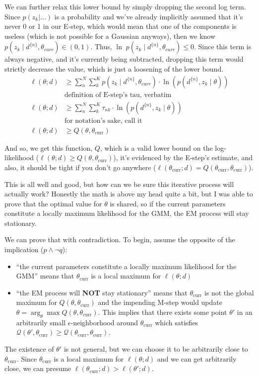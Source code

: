 We can further relax this lower bound by simply dropping the second log term. Since $p(z_k|...)$ is a probability and we've already implicitly assumed that it's never 0 or 1 in our E-step, which would mean that one of the components is useless (which is not possible for a Gaussian anyways), then we know $p(z_k\mid d^{\{n\}}, \theta_{curr}) \in(0,1)$. Thus, $\ln\;p(z_k\mid d^{\{n\}}, \theta_{curr}) \leq 0$. Since this term is always negative, and it's currently being subtracted, dropping this term would strictly decrease the value, which is just a loosening of the lower bound.
\begin{align*}
    \ell(\theta; d) &\geq \sum_n^N\sum_k^K p(z_k\mid d^{\{n\}},\theta_{curr})\cdot\ln\left( p(d^{\{n\}},z_k\mid\theta) \right) \\
    &\text{definition of E-step's tau, verbatim} \\
    \ell(\theta; d) &\geq \sum_n^N\sum_k^K \tau_{nk}\cdot\ln\left( p(d^{\{n\}},z_k\mid\theta)  \right)\\
    &\text{for notation's sake, call it} \\
    \ell(\theta; d) &\geq Q(\theta,\theta_{\text{curr}})
\end{align*}

And so, we get this function, $Q$, which is a valid lower bound on the log-likelihood ($\ell(\theta; d) \geq Q(\theta,\theta_{\text{curr}})$), it's evidenced by the E-step's estimate, and also, it should be tight if you don't go anywhere ($\ell(\theta_{\text{curr}}; d) = Q(\theta_{\text{curr}},\theta_{\text{curr}})$).

\smallskip This is all well and good, but how can we be sure this iterative process will actually work? Honestly the math is above my head quite a bit, but I was able to prove that the optimal value for $\theta$ is shared, so if the current parameters constitute a locally maximum likelihood for the GMM, the EM process will stay stationary.

\bigskip We can prove that with contradiction. To begin, assume the opposite of the implication ($p\land\lnot q$):\begin{itemize}
    \item ``the current parameters constitute a locally maximum likelihood for the GMM'' means that $\theta_{\text{curr}}$ is a local maximum for $\ell(\theta; d)$
    \item ``the EM process will \textbf{NOT} stay stationary'' means that $\theta_{\text{curr}}$ is not the global maximum for $Q(\theta,\theta_{\text{curr}})$ and the impending M-step would update $\theta=\arg_\theta\max Q(\theta,\theta_{\text{curr}})$. This implies that there exists some point $\theta'$ in an arbitrarily small $\epsilon$-neighborhood around $\theta_{\text{curr}}$ which satisfies $\mathcal{Q}(\theta', \theta_{\text{curr}})\geq\mathcal{Q}(\theta_{\text{curr}}, \theta_{\text{curr}})$.
\end{itemize}
The existence of $\theta'$ is not general, but we can choose it to be arbitrarily close to $\theta_{\text{curr}}$. Since $\theta_{\text{curr}}$ is a local maximum for $\ell(\theta; d)$ and we can get arbitrarily close, we can presume $\ell(\theta_{\text{curr}}; d)> \ell(\theta'; d)$.

